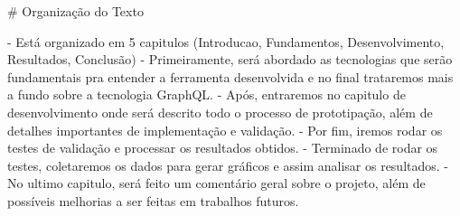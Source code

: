 # Organização do Texto

- Está organizado em 5 capitulos (Introducao, Fundamentos, Desenvolvimento, Resultados, Conclusão)
- Primeiramente, será abordado as tecnologias que serão fundamentais pra entender a ferramenta desenvolvida e no final trataremos mais a fundo sobre a tecnologia GraphQL.
- Após, entraremos no capitulo de desenvolvimento onde será descrito todo o processo de prototipação, além de detalhes importantes de implementação e validação.
- Por fim, iremos rodar os testes de validação e processar os resultados obtidos.
- Terminado de rodar os testes, coletaremos os dados para gerar gráficos e assim analisar os resultados.
- No ultimo capitulo, será feito um comentário geral sobre o projeto, além de possíveis melhorias a ser feitas em trabalhos futuros.
